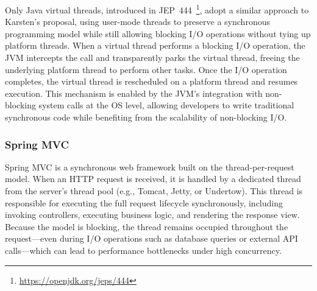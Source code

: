 Only Java virtual threads, introduced in
JEP~444~\footnote{\url{https://openjdk.org/jeps/444}}, adopt a similar approach
to Karsten's proposal, using user-mode threads to preserve a synchronous
programming model while still allowing blocking I/O operations without tying up
platform threads. When a virtual thread performs a blocking I/O operation, the
JVM intercepts the call and transparently parks the virtual thread, freeing the
underlying platform thread to perform other tasks. Once the I/O operation
completes, the virtual thread is rescheduled on a platform thread and resumes
execution. This mechanism is enabled by the JVM's integration with non-blocking
system calls at the OS level, allowing developers to write traditional
synchronous code while benefiting from the scalability of non-blocking I/O.

\subsubsection{Spring MVC}

Spring MVC is a synchronous web framework built on the
thread-per-request model. When an HTTP request is received, it is handled by a
dedicated thread from the server’s thread pool (e.g., Tomcat, Jetty, or
Undertow). This thread is responsible for executing the full request lifecycle
synchronously, including invoking controllers, executing business logic, and
rendering the response view. Because the model is blocking, the thread remains
occupied throughout the request—even during I/O operations such as database
queries or external API calls—which can lead to performance bottlenecks under
high concurrency.

